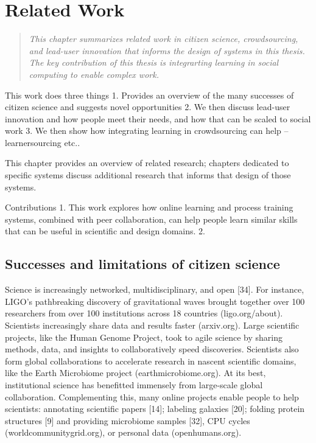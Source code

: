 
\chapter{Related Work}

\begin{quote}
\emph{This chapter summarizes related work in citizen science, crowdsourcing, and  lead-user innovation that informs the design of systems in this thesis. The key contribution of this thesis is integrarting learning in social computing to enable complex work. }

\end{quote}
\vspace{0.25in}


This work does three things
1. Provides an overview of the many successes of citizen science and suggests novel opportunities
2. We then discuss lead-user innovation and how people meet their needs, and how that can be scaled to social work
3. We then show how integrating learning in crowdsourcing can help -- learnersourcing etc.. 

This chapter provides an overview of related research; chapters dedicated to specific systems discuss additional research that informs that design of those systems.

Contributions
1. This work explores how
online learning and process training systems, combined with
peer collaboration, can help people learn similar skills that
can be useful in scientific and design domains.
2. 


\section{Successes and limitations of citizen science}
Science is increasingly networked, multidisciplinary, and
open [34]. For instance, LIGO’s pathbreaking discovery of
gravitational waves brought together over 100 researchers
from over 100 institutions across 18 countries (ligo.org/about). 
Scientists increasingly share data and results faster (arxiv.org). 
Large scientific projects, like the Human Genome Project, 
took to agile science by sharing methods, data, and insights to 
collaboratively speed discoveries. Scientists also form global 
collaborations to accelerate research in nascent scientific domains, 
like the Earth Microbiome project (earthmicrobiome.org).
At its best, institutional science has benefitted immensely
from large-scale global collaboration. Complementing this,
many online projects enable people to help scientists: annotating scientific papers [14]; 
labeling galaxies [20]; folding protein structures [9] and providing microbiome samples
[32], CPU cycles (worldcommunitygrid.org), or personal data
(openhumans.org). 

